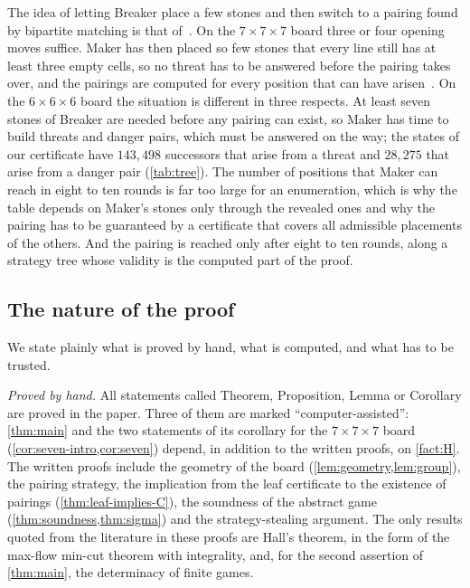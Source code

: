 The idea of letting Breaker place a few stones and then switch to a pairing found by bipartite matching
is that of~\cite{CainRaymondKallersjo2025}. On the $7\times7\times7$ board three or four opening moves
suffice. Maker has then placed so few stones that every line still has at least three empty cells, so
no threat has to be answered before the pairing takes over, and the pairings are computed for every
position that can have arisen~\cite{CainRaymondKallersjo2025}. On the $6\times6\times6$ board the
situation is different in three respects. At least seven stones of Breaker are needed before any
pairing can exist, so Maker has time to build threats and danger pairs, which must be answered on the
way; the states of our certificate have $143{,}498$ successors that arise from a threat and $28{,}275$
that arise from a danger pair (\cref{tab:tree}). The number of positions that Maker can reach in eight
to ten rounds is far too large for an enumeration, which is why the table depends on Maker's stones only through the
revealed ones and why the pairing has to be guaranteed by a certificate that covers all admissible placements
of the others. And the pairing is reached only after eight to ten rounds, along a strategy tree whose
validity is the computed part of the proof.

\subsection{The nature of the proof}\label{ssec:intro-nature}

We state plainly what is proved by hand, what is computed, and what has to be trusted.

\emph{Proved by hand.} All statements called Theorem, Proposition, Lemma or Corollary are proved in the
paper. Three of them are marked ``computer-assisted'': \cref{thm:main} and the two statements of its
corollary for the $7\times7\times7$ board (\cref{cor:seven-intro,cor:seven}) depend, in addition to
the written proofs, on \cref{fact:H}. The written proofs include
the geometry of the board (\cref{lem:geometry,lem:group}), the pairing strategy, the implication from
the leaf certificate to the existence of pairings (\cref{thm:leaf-implies-C}), the soundness of the
abstract game (\cref{thm:soundness,thm:sigma}) and the strategy-stealing argument. The only results
quoted from the literature in these proofs are Hall's theorem, in the form of the max-flow min-cut
theorem with integrality, and, for the second assertion of \cref{thm:main}, the determinacy of finite
games.

